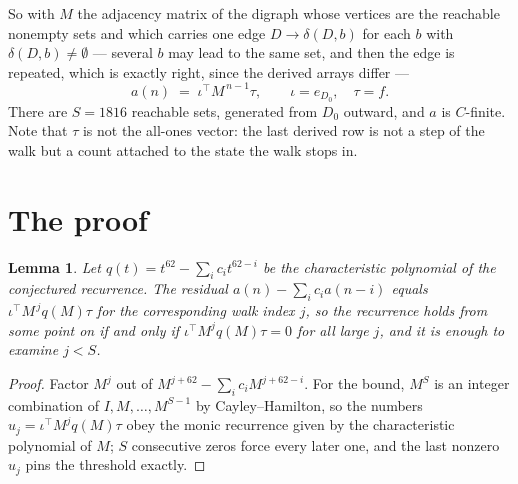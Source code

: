 \documentclass[11pt,a4paper]{article}
\theoremstyle{plain}
\newtheorem{lemma}[theorem]{Lemma}
\theoremstyle{definition}
\begin{document}
So with $M$ the adjacency matrix of the digraph whose vertices are the reachable nonempty sets
and which carries one edge $D\to\delta(D,b)$ for each $b$ with $\delta(D,b)\neq\emptyset$ ---
several $b$ may lead to the same set, and then the edge is repeated, which is exactly right,
since the derived arrays differ ---
\[
a(n)\;=\;\iota^{\!\top}M^{\,n-1}\tau,\qquad \iota=e_{D_0},\quad \tau=f .
\]
There are $S=1816$ reachable sets, generated from $D_0$ outward, and $a$ is $C$-finite.
Note that $\tau$ is not the all-ones vector: the last derived row is not a
step of the walk but a count attached to the state the walk stops in.

\section{The proof}

\begin{lemma}\label{lem:crit}
Let $q(t)=t^{62}-\sum_i c_it^{62-i}$ be the characteristic polynomial of the
conjectured recurrence. The residual $a(n)-\sum_ic_ia(n-i)$ equals
$\iota^{\!\top}M^{\,j}q(M)\tau$ for the corresponding walk index $j$, so the recurrence
holds from some point on if and only if $\iota^{\!\top}M^{j}q(M)\tau=0$ for all large $j$,
and it is enough to examine $j<S$.
\end{lemma}

\begin{proof}
Factor $M^{j}$ out of $M^{j+62}-\sum_ic_iM^{j+62-i}$. For the bound, $M^{S}$
is an integer combination of $I,M,\dots,M^{S-1}$ by Cayley--Hamilton, so the numbers
$u_j=\iota^{\!\top}M^{j}q(M)\tau$ obey the monic recurrence given by the characteristic
polynomial of $M$; $S$ consecutive zeros force every later one, and the last nonzero $u_j$
pins the threshold exactly.
\end{proof}
\end{document}
